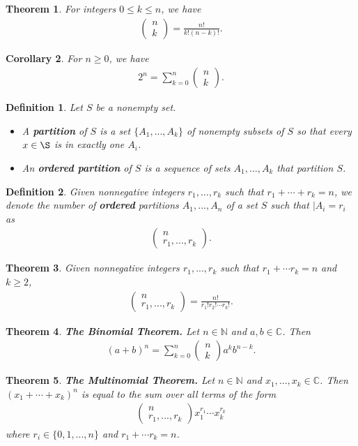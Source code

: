 \documentclass{article}
\theoremstyle{sltheorem}
\newtheorem{definition}{Definition}[section]
\newtheorem{theorem}{Theorem}[section]
\newtheorem{corollary}[theorem]{Corollary}
\newcommand{\N}{\mathbb{N}}
\renewcommand{\C}{\mathbb{C}}
\newcommand*\binco[2]{\begin{pmatrix}
    #1\\#2
\end{pmatrix}}
\begin{document}
\begin{theorem}
    For integers $0\leq k \leq n$, we have
    \begin{align*}
        \binco{n}{k}=\frac{n!}{k!(n-k)!}.
    \end{align*}
\end{theorem}
\begin{corollary}
    For $n\geq 0$, we have
    \begin{align*}
        2^n = \sum_{k=0}^n \binco{n}{k}.
    \end{align*}
\end{corollary}
\begin{definition}
    Let $S$ be a nonempty set.
    \begin{itemize}
        \item A \textbf{partition} of $S$ is a set $\{A_1,...,A_k\}$ of nonempty subsets of $S$ so that every $x\in\S$ is in exactly one $A_i$.
        \item An \textbf{ordered partition} of $S$ is a sequence of sets $A_1,...,A_k$ that partition $S$.
    \end{itemize}
\end{definition}
\begin{definition}
    Given nonnegative integers $r_1, ..., r_k$ such that $r_1+\cdots + r_k=n$, we denote the number of \textbf{ordered} partitions $A_1,..., A_n$ of a set $S$ such that $|A_i=r_i$ as
    \begin{align*}
        \binco{n}{r_1,...,r_k}.
    \end{align*}
\end{definition}
\begin{theorem}
    Given nonnegative integers $r_1, ..., r_k$ such that $r_1+\cdots r_k=n$ and $k\geq 2$, 
    \begin{align*}
        \binco{n}{r_1, ..., r_k}=\frac{n!}{r_1!r_2!\cdots r_k!}.
    \end{align*}
\end{theorem}
\begin{theorem}
    \textbf{The Binomial Theorem.} Let $n\in\N$ and $a,b\in\C$. Then
    \begin{align*}
        (a+b)^n=\sum_{k=0}^n \binco{n}{k}a^kb^{n-k}.
    \end{align*}
\end{theorem}
\begin{theorem}
    \textbf{The Multinomial Theorem.} Let $n\in\N$ and $x_1, ..., x_k\in\C$. Then $(x_1+\cdots+x_k)^n$ is equal to the sum over all terms of the form
    \begin{align*}
        \binco{n}{r_1,...,r_k}x_1^{r_1}\cdots x_k^{r_k}
    \end{align*}
    where $r_i\in\{0,1,...,n\}$ and $r_1+\cdots r_k=n$.
\end{theorem}
\end{document}
